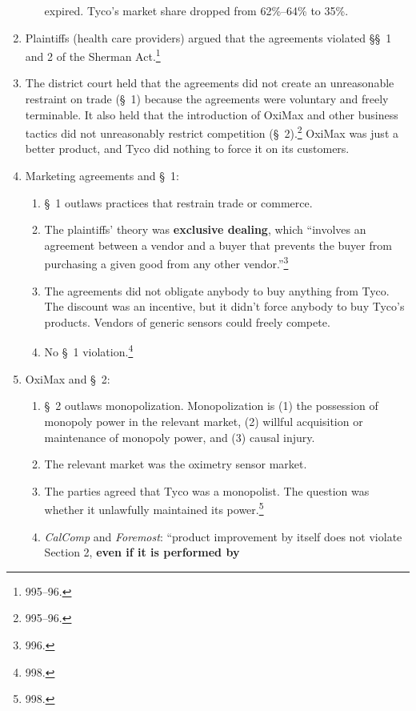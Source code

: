 \begin{enumerate}
\begin{enumerate}
        expired. Tyco's market share dropped from 62\%--64\% to 35\%.
    \end{enumerate}
    \item Plaintiffs (health care providers) argued that the agreements 
    violated \S\S\ 1 and 2 of the Sherman Act.\footnote{995--96.}
    \item The district court held that the agreements did not create an 
    unreasonable restraint on trade (\S\ 1) because the agreements were 
    voluntary and freely terminable. It also held that the introduction of 
    OxiMax and other business tactics did not unreasonably restrict 
    competition (\S\ 2).\footnote{995--96.} OxiMax was just a better product, 
    and Tyco did nothing to force it on its customers.
    \item Marketing agreements and \S\ 1:
    \begin{enumerate}
        \item \S\ 1 outlaws practices that restrain trade or commerce.
        \item The plaintiffs' theory was \textbf{exclusive dealing}, which 
        ``involves an agreement between a vendor and a buyer that prevents the 
        buyer from purchasing a given good from any other 
        vendor.''\footnote{996.}
        \item The agreements did not obligate anybody to buy anything from 
        Tyco. The discount was an incentive, but it didn't force anybody to 
        buy Tyco's products. Vendors of generic sensors could freely compete.
        \item No \S\ 1 violation.\footnote{998.}
    \end{enumerate}
    \item OxiMax and \S\ 2:
    \begin{enumerate}
        \item \S\ 2 outlaws monopolization. Monopolization is (1) the 
        possession of monopoly power in the relevant market, (2) willful 
        acquisition or maintenance of monopoly power, and (3) causal injury.
        \item The relevant market was the oximetry sensor market.
        \item The parties agreed that Tyco was a monopolist. The question was 
        whether it unlawfully maintained its power.\footnote{998.}
        \item \emph{CalComp} and \emph{Foremost}: ``product improvement by 
        itself does not violate Section 2, \textbf{even if it is performed by 
}
\end{enumerate}
\end{enumerate}
